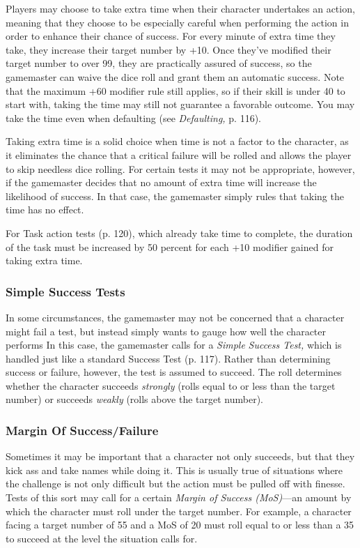 Players may choose to take extra time when their 
character undertakes an action, meaning that they 
choose to be especially careful when performing the 
action in order to enhance their chance of success. For 
every minute of extra time they take, they increase 
their target number by +10. Once they've modified 
their target number to over 99, they are practically assured
of success, so the gamemaster can waive the dice
roll and grant them an automatic success. Note that 
the maximum +60 modifier rule still applies, so if their 
skill is under 40 to start with, taking the time may still 
not guarantee a favorable outcome. You may take the 
time even when defaulting (see \textit{Defaulting, }p. 116).

Taking extra time is a solid choice when time is not 
a factor to the character, as it eliminates the chance 
that a critical failure will be rolled and allows the 
player to skip needless dice rolling. For certain tests it 
may not be appropriate, however, if the gamemaster 
decides that no amount of extra time will increase the 
likelihood of success. In that case, the gamemaster 
simply rules that taking the time has no effect.

For Task action tests (p. 120), which already take 
time to complete, the duration of the task must be 
increased by 50 percent for each +10 modifier gained 
for taking extra time.

\subsubsection{Simple Success Tests}

In some circumstances, the gamemaster may not be 
concerned that a character might fail a test, but instead 
simply wants to gauge how well the character performs
In this case, the gamemaster calls for a \textit{Simple }
\textit{Success Test,} which is handled just like a standard 
Success Test (p. 117). Rather than determining success
or failure, however, the test is assumed to succeed.
The roll determines whether the character succeeds 
\textit{strongly }(rolls equal to or less than the target number) 
or succeeds \textit{weakly }(rolls above the target number).

\subsubsection{Margin Of Success/Failure}

Sometimes it may be important that a character not 
only succeeds, but that they kick ass and take names 
while doing it. This is usually true of situations where 
the challenge is not only difficult but the action must 
be pulled off with finesse. Tests of this sort may call 
for a certain \textit{Margin of Success (MoS)}—an amount by 
which the character must roll under the target number. 
For example, a character facing a target number of 55 
and a MoS of 20 must roll equal to or less than a 35 
to succeed at the level the situation calls for.

